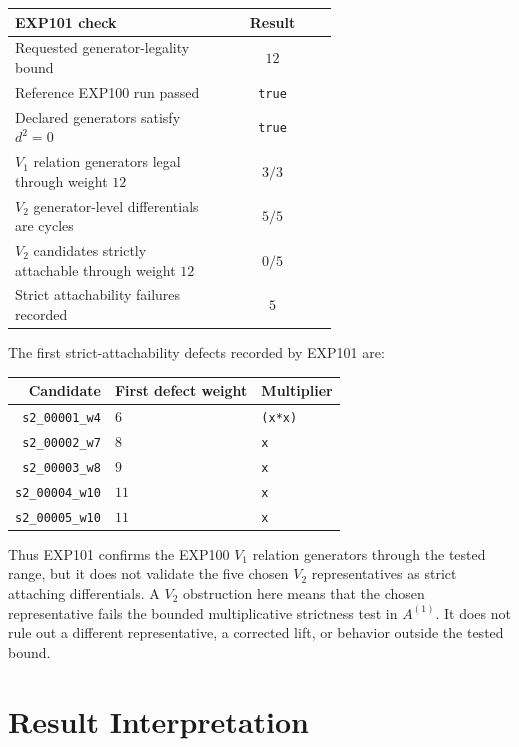 \documentclass[11pt]{article}
\begin{document}
\begin{center}
\begin{tabular}{L{0.64\linewidth}c}
\toprule
EXP101 check & Result \\
\midrule
Requested generator-legality bound & \(12\) \\
Reference EXP100 run passed & \texttt{true} \\
Declared generators satisfy \(d^2=0\) & \texttt{true} \\
\(V_1\) relation generators legal through weight \(12\) & \(3/3\) \\
\(V_2\) generator-level differentials are cycles & \(5/5\) \\
\(V_2\) candidates strictly attachable through weight \(12\) & \(0/5\) \\
Strict attachability failures recorded & \(5\) \\
\bottomrule
\end{tabular}
\end{center}

The first strict-attachability defects recorded by EXP101 are:

\begin{center}
\begin{tabular}{rll}
\toprule
Candidate & First defect weight & Multiplier \\
\midrule
\texttt{s2\_00001\_w4} & \(6\) & \texttt{(x*x)} \\
\texttt{s2\_00002\_w7} & \(8\) & \texttt{x} \\
\texttt{s2\_00003\_w8} & \(9\) & \texttt{x} \\
\texttt{s2\_00004\_w10} & \(11\) & \texttt{x} \\
\texttt{s2\_00005\_w10} & \(11\) & \texttt{x} \\
\bottomrule
\end{tabular}
\end{center}

Thus EXP101 confirms the EXP100 \(V_1\) relation generators through the tested
range, but it does not validate the five chosen \(V_2\) representatives as
strict attaching differentials.  A \(V_2\) obstruction here means that the
chosen representative fails the bounded multiplicative strictness test in
\(A^{(1)}\).  It does not rule out a different representative, a corrected
lift, or behavior outside the tested bound.

\section*{Result Interpretation}
\end{document}
